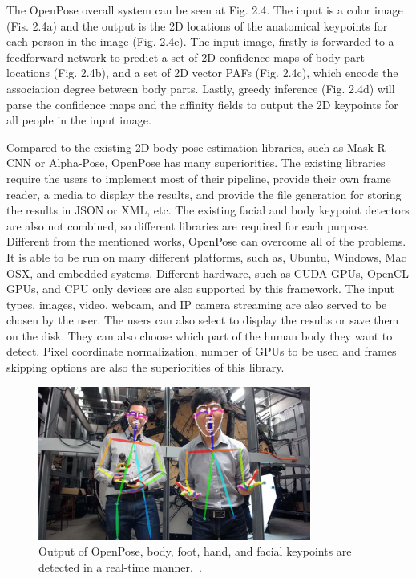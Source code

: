 The OpenPose overall system can be seen at Fig. 2.4. The input is a color image (Fis. 2.4a) and the output is the 2D locations of the anatomical keypoints for each person in the image (Fig. 2.4e). The input image, firstly is forwarded to a feedforward network to predict a set of 2D confidence maps of body part locations (Fig. 2.4b), and a set of 2D vector PAFs (Fig. 2.4c), which encode the association degree between body parts. Lastly, greedy inference (Fig. 2.4d) will parse the confidence maps and the affinity fields to output the 2D keypoints for all people in the input image.

Compared to the existing 2D body pose estimation libraries, such as Mask R-CNN or Alpha-Pose, OpenPose has many superiorities. The existing libraries require the users to implement most of their pipeline, provide their own frame reader, a media to display the results, and provide the file generation for storing the results in JSON or XML, etc. The existing facial and body keypoint detectors are also not combined, so different libraries are required for each purpose. Different from the mentioned works, OpenPose can overcome all of the problems. It is able to be run on many different platforms, such as, Ubuntu, Windows, Mac OSX, and embedded systems. Different hardware, such as CUDA GPUs, OpenCL GPUs, and CPU only devices are also supported by this framework. The input types, images, video, webcam, and IP camera streaming are also served to be chosen by the user. The users can also select to display the results or save them on the disk. They can also choose which part of the human body they want to detect. Pixel coordinate normalization, number of GPUs to be used and frames skipping options are also the superiorities of this library.

\begin{figure}[H]
	\begin{center}
		\includegraphics[width=0.8\textwidth]{figures/openposeeg.png}
		\caption{Output of OpenPose, body, foot, hand, and facial keypoints are detected in a real-time manner.~\cite{cao2018openpose}.} 
		\label{fig:4_OpenPoseFlow}
	\end{center}
\end{figure}